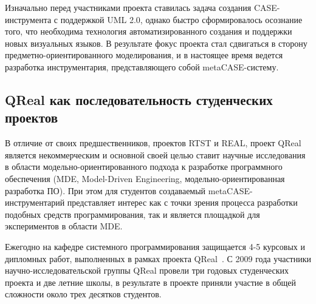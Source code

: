 \documentclass[a4paper]{article}
\begin{document}
Изначально перед участниками проекта ставилась задача создания CASE-инструмента с поддержкой UML 2.0, однако быстро сформировалось осознание того, что необходима технология автоматизированного создания и поддержки новых визуальных языков. В результате фокус проекта стал сдвигаться в сторону предметно-ориентированного моделирования, и в настоящее время ведется разработка инструментария, представляющего собой metaCASE-систему. 

\subsection{QReal как последовательность студенческих проектов}

В отличие от своих предшественников, проектов RTST и REAL, проект QReal является некоммерческим и основной своей целью ставит научные исследования в области модельно-ориентированного подхода к разработке программного обеспечения (MDE, Model-Driven Engineering, модельно-ориентированная разработка ПО). При этом для студентов создаваемый metaCASE-инструментарий представляет интерес как с точки зрения процесса разработки подобных средств программирования, так и является площадкой для экспериментов в области MDE. 

Ежегодно на кафедре системного программирования защищается 4-5 курсовых и дипломных работ, выполненных в рамках проекта QReal~\cite{termPapers}. С 2009 года участники научно-исследовательской группы QReal провели три годовых студенческих проекта и две летние школы, в результате в проекте приняли участие в общей сложности около трех десятков студентов. 
\end{document}
